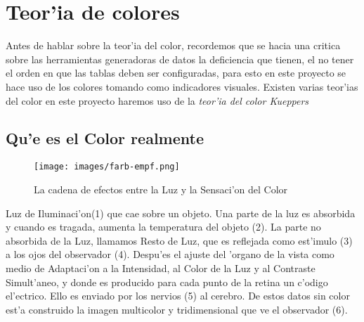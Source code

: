 \section{Teor'ia de colores}
Antes de hablar sobre la teor'ia del color, recordemos que se hacia una critica sobre las herramientas generadoras de datos la deficiencia que tienen, el no tener el orden en que las tablas deben ser configuradas, para esto en este proyecto se hace uso de los colores tomando como indicadores visuales.
Existen varias teor'ias del color en este proyecto haremos uso de la \textit{teor'ia del color Kueppers}
\subsection{Qu'e es el Color realmente}
\begin{figure}[hbtp]
\centering
\texttt{[image: images/farb-empf.png]}
\caption{La cadena de efectos entre la Luz y la Sensaci'on del Color}
\end{figure}

Luz de Iluminaci'on(1) que cae sobre un objeto. Una parte de la luz es absorbida y cuando es tragada, aumenta la temperatura del objeto (2). La parte no absorbida de la Luz, llamamos Resto de Luz, que es reflejada como est'imulo (3) a los ojos del observador (4). Despu'es el ajuste del 'organo de la vista como medio de Adaptaci'on a la Intensidad, al Color de la Luz y al Contraste Simult'aneo, y donde es producido para cada punto de la retina un c'odigo el'ectrico. Ello es enviado por los nervios (5) al cerebro. De estos datos sin color est'a construido la imagen multicolor y tridimensional que ve el observador (6).
   
